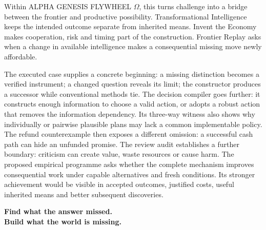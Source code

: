 Within ALPHA GENESIS FLYWHEEL $\Omega$, this turns challenge into a bridge between the frontier and productive possibility. Transformational Intelligence keeps the intended outcome separate from inherited means. Invent the Economy makes cooperation, risk and timing part of the construction. Frontier Replay asks when a change in available intelligence makes a consequential missing move newly affordable.

The executed case supplies a concrete beginning: a missing distinction becomes a verified instrument; a changed question reveals its limit; the constructor produces a successor while conventional methods tie. The decision compiler goes further: it constructs enough information to choose a valid action, or adopts a robust action that removes the information dependency. Its three-way witness also shows why individually or pairwise plausible plans may lack a common implementable policy. The refund counterexample then exposes a different omission: a successful cash path can hide an unfunded promise. The review audit establishes a further boundary: criticism can create value, waste resources or cause harm. The proposed empirical programme asks whether the complete mechanism improves consequential work under capable alternatives and fresh conditions. Its stronger achievement would be visible in accepted outcomes, justified costs, useful inherited means and better subsequent discoveries.
\begin{thesisbox}
\large\bfseries Find what the answer missed.\\Build what the world is missing.
\end{thesisbox}
